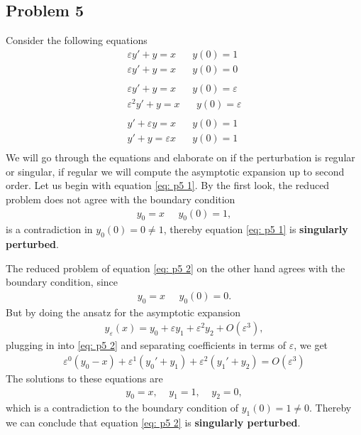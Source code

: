 \documentclass[a4paper]{article}
\newcommand{\eps}{\varepsilon}
\begin{document}
\subsection{Problem 5}
Consider the following equations
\begin{align}
    \label{eq: p5 1}\eps y' + y = x \;\;\;\;\;\; y(0) = 1\\
    \label{eq: p5 2}\eps y' + y = x \;\;\;\;\;\; y(0) = 0\\
    \nonumber\\
    \label{eq: p5 3}\eps y' + y = x \;\;\;\;\;\; y(0) = \eps\\
    \label{eq: p5 4}\eps^2 y' + y = x \;\;\;\;\;\; y(0) = \eps\\
    \nonumber\\
    \label{eq: p5 5}y' + \eps y = x \;\;\;\;\;\; y(0) = 1\\
    \label{eq: p5 6}y' + y = \eps x \;\;\;\;\;\; y(0) = 1\\
\end{align}
We will go through the equations and elaborate on if the perturbation is
regular or singular, if regular we will compute the asymptotic expansion up
to second order.
Let us begin with equation \ref{eq: p5 1}. By the first look, the reduced
problem does not agree with the boundary condition
\begin{align}
    y_0 = x \;\;\;\;\; y_0(0) = 1,
\end{align}
is a contradiction in $y_0(0) = 0 \neq 1$, thereby equation \ref{eq: p5 1} is
\textbf{singularly perturbed}.

The reduced problem of equation \ref{eq: p5 2} on the other hand agrees with
the boundary condition, since
\begin{align}
    y_0 = x \;\;\;\;\; y_0(0) = 0.
\end{align}
But by doing the ansatz for the asymptotic expansion
\begin{align}
    y_\eps(x) = y_0 + \eps y_1 + \eps^2 y_2 + O(\eps^3),
\end{align}
plugging in into \ref{eq: p5 2} and separating coefficients in terms of
$\eps$, we get
\begin{align}
    \eps^0 (y_0 -x) + \eps^1(y_0' + y_1) + \eps^2(y_1' + y_2) = O(\eps^3)
\end{align}
The solutions to these equations are
\begin{align}
    y_0 = x, \;\;\;\; y_1 = 1, \;\;\;\; y_2 = 0,
\end{align}
which is a contradiction to the boundary condition of $y_1(0) = 1 \neq 0$.
Thereby we can conclude that equation \ref{eq: p5 2} is \textbf{singularly
perturbed}.
\end{document}
